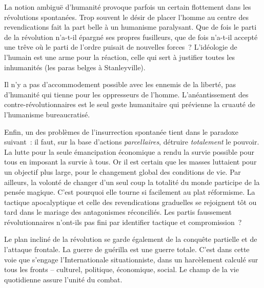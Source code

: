 \documentclass[french,twoside]{book} %
\newcommand{\astermono}{\medskip\centerline{\color{rubric}\large\selectfont{\syms ✻}}\medskip\par}%
\begin{document}
\astermono

\noindent La notion ambiguë d’humanité provoque parfois un certain flottement dans les révolutions spontanées. Trop souvent le désir de placer l’homme au centre des revendications fait la part belle à un humanisme paralysant. Que de fois le parti de la révolution n’a-t-il épargné ses propres fusilleurs, que de fois n’a-t-il accepté une trêve où le parti de l’ordre puisait de nouvelles forces ? L’idéologie de l’humain est une arme pour la réaction, celle qui sert à justifier toutes les inhumanités (les paras belges à Stanleyville).\par
Il n’y a pas d’accommodement possible avec les ennemis de la liberté, pas d’humanité qui tienne pour les oppresseurs de l’homme. L’anéantissement des contre-révolutionnaires est le seul geste humanitaire qui prévienne la cruauté de l’humanisme bureaucratisé.\par
Enfin, un des problèmes de l’insurrection spontanée tient dans le paradoxe suivant : il faut, sur la base d’actions \emph{parcellaires}, détruire \emph{totalement} le pouvoir. La lutte pour la seule émancipation économique a rendu la survie possible pour tous en imposant la survie à tous. Or il est certain que les masses luttaient pour un objectif plus large, pour le changement global des conditions de vie. Par ailleurs, la volonté de changer d’un seul coup la totalité du monde participe de la pensée magique. C’est pourquoi elle tourne si facilement au plat réformisme. La tactique apocalyptique et celle des revendications graduelles se rejoignent tôt ou tard dans le mariage des antagonismes réconciliés. Les partis faussement révolutionnaires n’ont-ils pas fini par identifier tactique et compromission ?\par
Le plan incliné de la révolution se garde également de la conquête partielle et de l’attaque frontale. La guerre de guérilla est une guerre totale. C’est dans cette voie que s’engage l’Internationale situationniste, dans un harcèlement calculé sur tous les fronts – culturel, politique, économique, social. Le champ de la vie quotidienne assure l’unité du combat.
\end{document}
